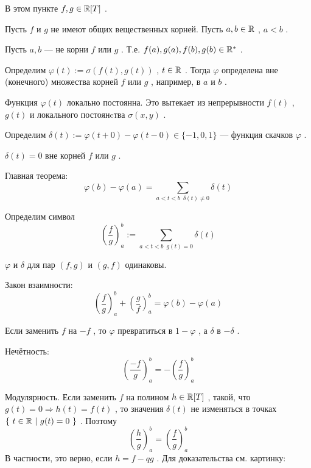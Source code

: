 \vspace

\SSbullet

В этом пункте \( f,g \in \mathbb{R}[T] \) .

\SSsect Пусть \( f \) и \( g \) не имеют общих вещественных корней. 
Пусть \( a,b \in \mathbb{R} \) , \( a < b \) .

\SSsect Пусть \( a,b \) --- не корни \( f \) или \( g \) .
Т.е. \( f(a),g(a),f(b),g(b) \in \mathbb{R}^* \) .

\SSsect[def] Определим \( \varphi(t) := \sigma(f(t),g(t)) \) , \( t \in \mathbb{R} \) .
Тогда \( \varphi \) определена вне (конечного) множества корней \( f \) или \( g \) ,
например, в \( a \) и \( b \) .

\SSsect Функция \( \varphi(t) \) локально постоянна. Это вытекает из непрерывности \( f(t) \) ,
\( g(t) \) и локального постоянcтва \( \sigma(x,y) \) .

\vspace
{}


\SSsect[def] Определим \( \delta(t) := \varphi(t+0) - \varphi(t-0) \in \{-1,0,1\} \) --- 
функция скачков \( \varphi \) .

\SSsect \( \delta(t) = 0 \) вне корней \( f \) или \( g \) .

\SSsect[!!] Главная теорема:
\[ \varphi(b) - \varphi(a) = \sum_{ a<t<b \enspace \delta(t) \neq 0 } \delta(t) \]

\def\Symbol#1#2{ \left( \frac{#1}{#2} \right)^b_a }

\SSsect[def] Определим символ
\[ \Symbol{f}{g} := \sum_{ a<t<b \enspace g(t)=0 } \delta(t) \]

\SSsect \( \varphi \) и \( \delta \) для пар \( (f,g) \) и \( (g,f) \) одинаковы.

\SSsect[!!] Закон взаимности:
\[ \Symbol{f}{g} + \Symbol{g}{f} = \varphi(b)-\varphi(a) \]

\SSsect Если заменить \( f \) на \( -f \) , то \( \varphi \) превратиться в \( 1-\varphi \) , а \( \delta \) в \( -\delta \) .

\SSsect[!] Нечётность:
\[ \Symbol{-f}{g} = - \Symbol{f}{g} \]

\SSsect[!] Модулярность. Если заменить \( f \) на полином \( h \in \mathbb{R}[T] \) , такой, что
\( g(t) = 0 \Rightarrow h(t) = f(t) \) , то значения \( \delta(t) \) не изменяться в точках
\( \left\lbrace~  t\in \mathbb{R}  ~|~  g(t) = 0  ~\right\rbrace \) . Поэтому
\[ \Symbol{h}{g} = \Symbol{f}{g} \]
В частности, это верно, если \( h=f-qg \) . Для доказательства см. картинку:

